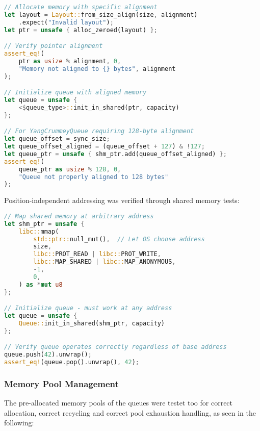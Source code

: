 \begin{lstlisting}[language=Rust, style=boxed, caption={Memory alignment verification test}, label={lst:alignment-test}]
// Allocate memory with specific alignment
let layout = Layout::from_size_align(size, alignment)
    .expect("Invalid layout");
let ptr = unsafe { alloc_zeroed(layout) };

// Verify pointer alignment
assert_eq!(
    ptr as usize % alignment, 0,
    "Memory not aligned to {} bytes", alignment
);

// Initialize queue with aligned memory
let queue = unsafe { 
    <$queue_type>::init_in_shared(ptr, capacity) 
};

// For YangCrummeyQueue requiring 128-byte alignment
let queue_offset = sync_size;
let queue_offset_aligned = (queue_offset + 127) & !127;
let queue_ptr = unsafe { shm_ptr.add(queue_offset_aligned) };
assert_eq!(
    queue_ptr as usize % 128, 0,
    "Queue not properly aligned to 128 bytes"
);
\end{lstlisting}

Position-independent addressing was verified through shared memory tests:

\begin{lstlisting}[language=Rust, style=boxed, caption={Position-independent addressing test}, label={lst:position-independent-test}]
// Map shared memory at arbitrary address
let shm_ptr = unsafe { 
    libc::mmap(
        std::ptr::null_mut(),  // Let OS choose address
        size,
        libc::PROT_READ | libc::PROT_WRITE,
        libc::MAP_SHARED | libc::MAP_ANONYMOUS,
        -1,
        0,
    ) as *mut u8
};

// Initialize queue - must work at any address
let queue = unsafe { 
    Queue::init_in_shared(shm_ptr, capacity) 
};

// Verify queue operates correctly regardless of base address
queue.push(42).unwrap();
assert_eq!(queue.pop().unwrap(), 42);
\end{lstlisting}

\subsubsection{Memory Pool Management}
The pre-allocated memory pools of the queues were testet too for correct allocation, correct recycling and correct pool exhaustion handling, as seen in the following:

